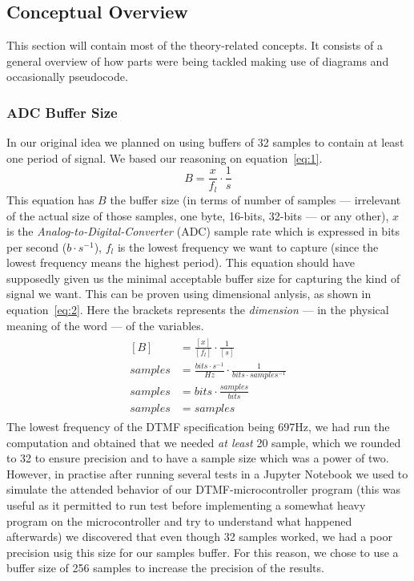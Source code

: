 \documentclass{cce2014-design}
\begin{document}
\subsection{Conceptual Overview}
This section will contain most of the theory-related concepts. It consists of
a general overview of how parts were being tackled making use of diagrams and
occasionally pseudocode.

\subsubsection{ADC Buffer Size}
In our original idea we planned on using buffers of 32 samples to contain at
least one period of signal. We based our reasoning on equation~\ref{eq:1}.
\begin{equation} \label{eq:1}
	B = \frac{x}{f_l}\cdot\frac{1}{s}
\end{equation}
This equation has $B$ the buffer size (in terms of number of samples — irrelevant
of the actual size of those samples, one byte, 16-bits, 32-bits — or any other),
$x$ is the \textit{Analog-to-Digital-Converter} (ADC) sample rate which is
expressed in bits per second ($b\cdot{}s^{-1}$), $f_l$ is the lowest frequency
we want to capture (since the lowest frequency means the highest period). This
equation should have supposedly given us the minimal acceptable buffer size for
capturing the kind of signal we want. This can be proven using dimensional
anlysis\cite{MIT-DA}, as shown in equation~\ref{eq:2}. Here the brackets
represents the \textit{dimension} — in the physical meaning of the word — of the
variables.
\begin{align}
	\begin{split}\label{eq:2}
		[B] &= \frac{[x]}{[f_l]}\cdot\frac{1}{[s]}\\
		samples &= \frac{bits\cdot{}s^{-1}}{Hz}
		\cdot\frac{1}{bits\cdot{}samples^{-1}}\\
		samples &= bits \cdot \frac{samples}{bits} \\
		samples &= samples
	\end{split}
\end{align}
The lowest frequency of the DTMF specification being 697Hz, we had run the
computation and obtained that we needed \textit{at least} 20 sample, which we
rounded to 32 to ensure precision and to have a sample size which was a power of
two. However, in practise after running several tests in a Jupyter Notebook we
used to simulate the attended behavior of our DTMF-microcontroller program (this
was useful as it permitted to run test before implementing a somewhat heavy
program on the microcontroller and try to understand what happened afterwards)
we discovered that even though 32 samples worked, we had a poor precision usig
this size for our samples buffer. For this reason, we chose to use a buffer size
of 256 samples to increase the precision of the results.
\end{document}
